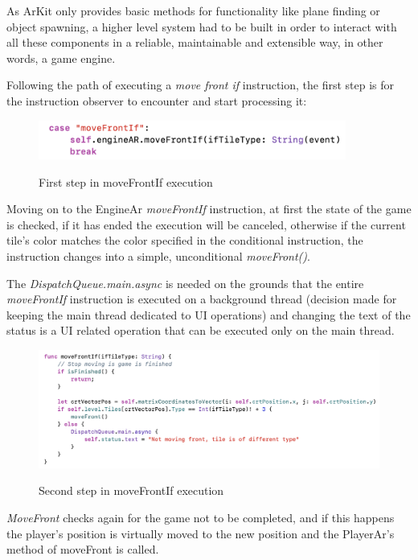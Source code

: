 \documentclass[12 pct]{report}
\begin{document}
As ArKit only provides basic methods for functionality like plane finding or object spawning, a higher level system had to be built in order to interact with all these components in a reliable, maintainable and extensible way, in other words, a game engine.

Following the path of executing a \textit{move front if} instruction, the first step is for the instruction observer to encounter and start processing  it:
\begin{figure}[H]
\includegraphics[width=0.9\textwidth]{move-front-if-1}
\centering
\label{fig:feature-points}
\caption{ First step in moveFrontIf execution }
\end{figure}

Moving on to the EngineAr \textit{moveFrontIf} instruction, at first the state of the game is checked, if it has ended the execution will be canceled, otherwise if the current tile's color matches the color specified in the conditional instruction, the instruction changes into a simple, unconditional \textit{moveFront()}.

The \textit{DispatchQueue.main.async} is needed on the grounds that the entire \textit{moveFrontIf} instruction is executed on a background thread (decision made for keeping the main thread dedicated to UI operations) and changing the text of the status is a UI related operation that can be executed only on the main thread.

\begin{figure}[H]
\includegraphics[width=1.0\textwidth]{move-front-if-2}
\centering
\label{fig:feature-points}
\caption{ Second step in moveFrontIf execution }
\end{figure}

\textit{MoveFront} checks again for the game not to be completed, and if this happens the player's position is virtually moved to the new position and the PlayerAr's method of moveFront is called. 
\end{document}
